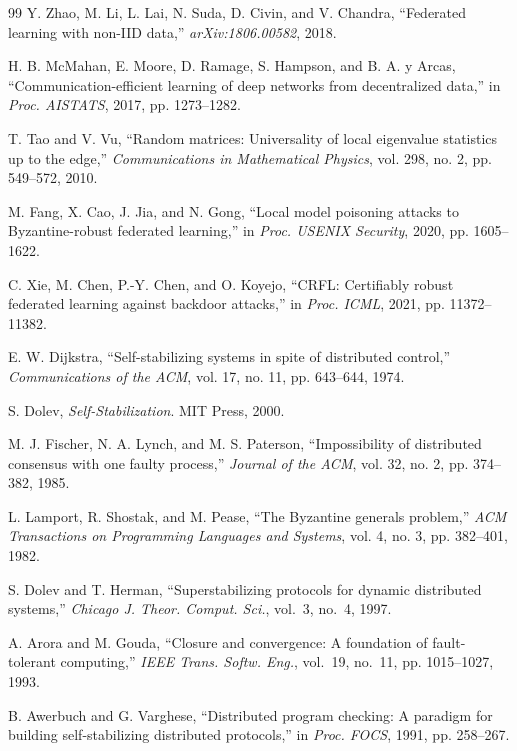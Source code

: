 \begin{thebibliography}{99}
 Y. Zhao, M. Li, L. Lai, N. Suda, D. Civin, and V. Chandra, ``Federated learning with non-IID data,'' \textit{arXiv:1806.00582}, 2018.

 H. B. McMahan, E. Moore, D. Ramage, S. Hampson, and B. A. y Arcas, ``Communication-efficient learning of deep networks from decentralized data,'' in \textit{Proc. AISTATS}, 2017, pp. 1273--1282.

 T. Tao and V. Vu, ``Random matrices: Universality of local eigenvalue statistics up to the edge,'' \textit{Communications in Mathematical Physics}, vol. 298, no. 2, pp. 549--572, 2010.

 M. Fang, X. Cao, J. Jia, and N. Gong, ``Local model poisoning attacks to Byzantine-robust federated learning,'' in \textit{Proc. USENIX Security}, 2020, pp. 1605--1622.

 C. Xie, M. Chen, P.-Y. Chen, and O. Koyejo, ``CRFL: Certifiably robust federated learning against backdoor attacks,'' in \textit{Proc. ICML}, 2021, pp. 11372--11382.

 E. W. Dijkstra, ``Self-stabilizing systems in spite of distributed control,'' \textit{Communications of the ACM}, vol. 17, no. 11, pp. 643--644, 1974.

 S. Dolev, \textit{Self-Stabilization}. MIT Press, 2000.

 M. J. Fischer, N. A. Lynch, and M. S. Paterson, ``Impossibility of distributed consensus with one faulty process,'' \textit{Journal of the ACM}, vol. 32, no. 2, pp. 374--382, 1985.

 L. Lamport, R. Shostak, and M. Pease, ``The Byzantine generals problem,'' \textit{ACM Transactions on Programming Languages and Systems}, vol. 4, no. 3, pp. 382--401, 1982.

 S. Dolev and T. Herman, ``Superstabilizing protocols for dynamic distributed systems,'' \textit{Chicago J. Theor. Comput. Sci.}, vol.~3, no.~4, 1997.

 A. Arora and M. Gouda, ``Closure and convergence: A foundation of fault-tolerant computing,'' \textit{IEEE Trans. Softw. Eng.}, vol.~19, no.~11, pp. 1015--1027, 1993.

 B. Awerbuch and G. Varghese, ``Distributed program checking: A paradigm for building self-stabilizing distributed protocols,'' in \textit{Proc. FOCS}, 1991, pp. 258--267.


\end{thebibliography}
